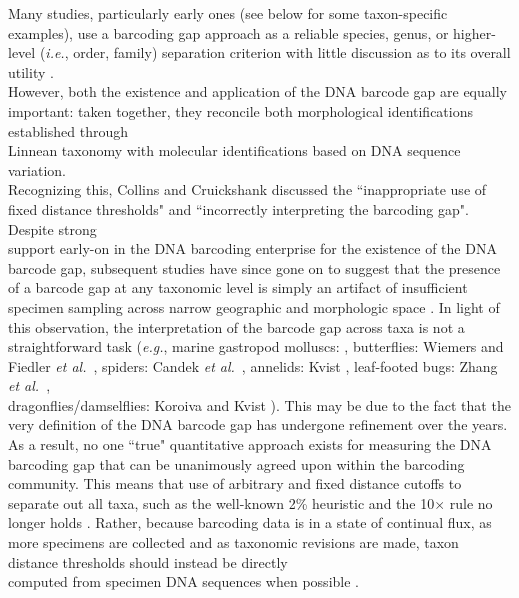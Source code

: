 Many studies, particularly early ones (see below for some taxon-specific examples), use a barcoding gap approach as a reliable species, genus, or higher-level (\textit{i.e.}, order, family) separation criterion with little discussion as to its overall utility \cite{candek2015dna}. \\ However, both the existence and application of the DNA barcode gap are equally important: taken together, they reconcile both morphological identifications established through \\ Linnean taxonomy with molecular identifications based on DNA sequence variation. \\ Recognizing this, Collins and Cruickshank \cite{collins2013seven} discussed the ``inappropriate use of fixed distance thresholds" and ``incorrectly interpreting the barcoding gap". Despite strong \\ support early-on in the DNA barcoding enterprise for the existence of the DNA barcode gap, subsequent studies have since gone on to suggest that the presence of a barcode gap at any taxonomic level is simply an artifact of insufficient specimen sampling across narrow geographic and morphologic space \cite{bergsten2012effect, candek2015dna, dasmahapatra2010mitochondrial}. In light of this observation, the interpretation of the barcode gap across taxa is not a straightforward task (\textit{e.g.}, marine gastropod molluscs: \cite{meyer2005dna}, butterflies: Wiemers and Fiedler \textit{et al.}~\cite{wiemers2007does}, spiders: Candek \textit{et al.}~\cite{candek2015dna}, annelids: Kvist \cite{kvist2017does}, leaf-footed bugs: Zhang \textit{et al.}~\cite{zhang2017species}, \\ dragonflies/damselflies: Koroiva and Kvist \cite{koroiva2018estimating}). This may be due to the fact that the very definition of the DNA barcode gap has undergone refinement over the years. As a result, no one ``true" quantitative approach exists for measuring the DNA barcoding gap that can be unanimously agreed upon within the barcoding community. This means that use of arbitrary and fixed distance cutoffs to separate out all taxa, such as the well-known 2\% heuristic \cite{hebert2003biological, hebert2003barcoding} and the 10$\times$ rule \cite{hebert2004identification} no longer holds \cite{collins2014known, zhang2017species}. Rather, because barcoding data is in a state of continual flux, as more specimens are collected and as taxonomic revisions are made, taxon distance thresholds should instead be directly \\ computed from specimen DNA sequences when possible \cite{collins2013seven, young2017barcode}. 


